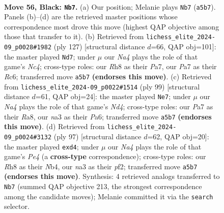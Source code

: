 \documentclass[11pt]{article}
\begin{document}
\clearpage

\begin{figure}[p]\centering
\begin{subfigure}{0.46\textwidth}\centering
\resizebox{\linewidth}{!}{%
\newchessgame
\chessboard[
  setfen={7r/p7/1pr1p1kp/n7/2PKP3/N7/P2B2PR/1R6 b - - 6 56},
  showmover=false,
  pgfstyle=straightmove, color=movearrow, markmove={a5-b7}
]}
\caption{}
\end{subfigure}\hfill
\begin{subfigure}{0.46\textwidth}\centering
\resizebox{\linewidth}{!}{%
\newchessgame
\chessboard[
  setfen={8/p3r2k/1pr3p1/2n3Rp/1R2PN1P/P3K3/6P1/8 b - - 17 64},
  showmover=false,
  pgfstyle=straightmove, color=movearrow, markmove={c5-d7}
]}
\caption{}
\end{subfigure}
\\[4pt]
\begin{subfigure}{0.46\textwidth}\centering
\resizebox{\linewidth}{!}{%
\newchessgame
\chessboard[
  setfen={r4k2/5p2/p1Rp3r/P2n4/3R4/2P4P/5pPK/5N2 b - - 2 50},
  showmover=false,
  pgfstyle=straightmove, color=movearrow, markmove={d5-e7}
]}
\caption{}
\end{subfigure}\hfill
\begin{subfigure}{0.46\textwidth}\centering
\resizebox{\linewidth}{!}{%
\newchessgame
\chessboard[
  setfen={8/pR6/4kpp1/4p2p/1nrB3P/5PK1/P1p2P2/2R5 b - - 0 49},
  showmover=false,
  pgfstyle=straightmove, color=movearrow, markmove={e5-d4}
]}
\caption{}
\end{subfigure}
\caption{\textbf{Move 56, Black: \texttt{Nb7}.} (a) Our position; Melanie plays \texttt{Nb7} (\texttt{a5b7}). Panels (b)--(d) are the retrieved master positions whose correspondence most drove this move (highest QAP objective among those that transfer to it). (b) Retrieved from \texttt{lichess\_elite\_2024-09\_p0028\#1982} (ply 127) [structural distance $d$=66, QAP obj=101]: the master played \texttt{Nd7}; under $\mu$ our \emph{Na4} plays the role of that game's \emph{Nc4}; cross-type roles: our \emph{R}h8 as their \emph{P}a7, our \emph{P}a7 as their \emph{R}c6; transferred move \texttt{a5b7} \textbf{(endorses this move)}. (c) Retrieved from \texttt{lichess\_elite\_2024-09\_p0022\#1514} (ply 99) [structural distance $d$=61, QAP obj=24]: the master played \texttt{Ne7}; under $\mu$ our \emph{Na4} plays the role of that game's \emph{Nd4}; cross-type roles: our \emph{P}a7 as their \emph{R}a8, our \emph{n}a3 as their \emph{P}a6; transferred move \texttt{a5b7} \textbf{(endorses this move)}. (d) Retrieved from \texttt{lichess\_elite\_2024-09\_p0024\#3132} (ply 97) [structural distance $d$=62, QAP obj=20]: the master played \texttt{exd4}; under $\mu$ our \emph{Na4} plays the role of that game's \emph{Pe4} (a \textbf{cross-type} correspondence); cross-type roles: our \emph{R}h8 as their \emph{N}b4, our \emph{n}a3 as their \emph{p}f2; transferred move \texttt{a5b7} \textbf{(endorses this move)}. Synthesis: 4 retrieved analogs transferred to \texttt{Nb7} (summed QAP objective 213, the strongest correspondence among the candidate moves); Melanie committed it via the \texttt{search} selector.}
\label{fig:thought-m111}
\end{figure}
\end{document}
